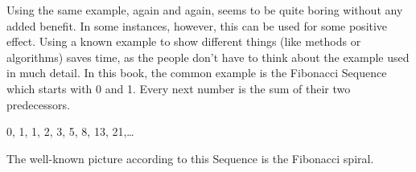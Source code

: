 
Using the same example, again and again, seems to be quite boring without any added benefit.
In some instances, however, this can be used for some positive effect. Using a known example to show different things (like methods or algorithms) saves time, as the people don't have to think about the example used in much detail.
In this book, the common example is the Fibonacci Sequence which starts with 0 and 1. Every next number is the sum of their two predecessors.

0, 1, 1, 2, 3, 5, 8, 13, 21,\ldots{}

The well-known picture according to this Sequence is the Fibonacci spiral.

